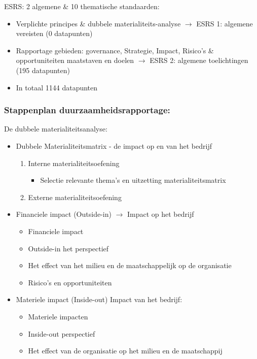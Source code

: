 \documentclass[12pt]{article}
\begin{document}
ESRS: 2 algemene \& 10 thematische standaarden:\begin{itemize}
    \item Verplichte principes \& dubbele materialiteits-analyse $\rightarrow$ ESRS 1: algemene vereisten (0 datapunten)
    \item Rapportage gebieden: governance, Strategie, Impact, Risico's \& opportuniteiten maatstaven en doelen $\rightarrow$ ESRS 2: algemene toelichtingen (195 datapunten)
    \item In totaal 1144 datapunten
\end{itemize}
\subsubsection{Stappenplan duurzaamheidsrapportage:}
De dubbele materialiteitsanalyse:\begin{itemize}
    \item Dubbele Materialiteitsmatrix - de impact op en van het bedrijf\begin{enumerate}
        \item Interne materialiteitsoefening\begin{itemize}
            \item Selectie relevante thema's en uitzetting materialiteitsmatrix
        \end{itemize}
        \item Externe materialiteitsoefening
    \end{enumerate}
    \item Financiele impact (Outside-in) $\rightarrow$ Impact op het bedrijf\begin{itemize}
        \item Financiele impact 
        \item Outside-in het perspectief 
        \item Het effect van het milieu en de maatschappelijk op de organisatie 
        \item Risico's en opportuniteiten
    \end{itemize}
    \item Materiele impact (Inside-out) Impact van het bedrijf:\begin{itemize}
        \item Materiele impacten 
        \item Inside-out perspectief 
        \item Het effect van de organisatie op het milieu en de maatschappij
    \end{itemize}
\end{itemize}
\end{document}
